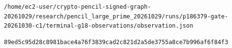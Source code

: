 \documentclass[10pt]{article}
\begin{document}
\texttt{\small /\allowbreak{}h\allowbreak{}o\allowbreak{}m\allowbreak{}e\allowbreak{}/\allowbreak{}e\allowbreak{}c\allowbreak{}2\allowbreak{}-\allowbreak{}u\allowbreak{}s\allowbreak{}e\allowbreak{}r\allowbreak{}/\allowbreak{}c\allowbreak{}r\allowbreak{}y\allowbreak{}p\allowbreak{}t\allowbreak{}o\allowbreak{}-\allowbreak{}p\allowbreak{}e\allowbreak{}n\allowbreak{}c\allowbreak{}i\allowbreak{}l\allowbreak{}-\allowbreak{}s\allowbreak{}i\allowbreak{}g\allowbreak{}n\allowbreak{}e\allowbreak{}d\allowbreak{}-\allowbreak{}g\allowbreak{}r\allowbreak{}a\allowbreak{}p\allowbreak{}h\allowbreak{}-\allowbreak{}2\allowbreak{}0\allowbreak{}2\allowbreak{}6\allowbreak{}1\allowbreak{}0\allowbreak{}2\allowbreak{}9\allowbreak{}/\allowbreak{}r\allowbreak{}e\allowbreak{}s\allowbreak{}e\allowbreak{}a\allowbreak{}r\allowbreak{}c\allowbreak{}h\allowbreak{}/\allowbreak{}p\allowbreak{}e\allowbreak{}n\allowbreak{}c\allowbreak{}i\allowbreak{}l\allowbreak{}\_\allowbreak{}l\allowbreak{}a\allowbreak{}r\allowbreak{}g\allowbreak{}e\allowbreak{}\_\allowbreak{}p\allowbreak{}r\allowbreak{}i\allowbreak{}m\allowbreak{}e\allowbreak{}\_\allowbreak{}2\allowbreak{}0\allowbreak{}2\allowbreak{}6\allowbreak{}1\allowbreak{}0\allowbreak{}2\allowbreak{}9\allowbreak{}/\allowbreak{}r\allowbreak{}u\allowbreak{}n\allowbreak{}s\allowbreak{}/\allowbreak{}p\allowbreak{}1\allowbreak{}8\allowbreak{}6\allowbreak{}3\allowbreak{}7\allowbreak{}9\allowbreak{}-\allowbreak{}g\allowbreak{}a\allowbreak{}t\allowbreak{}e\allowbreak{}-\allowbreak{}2\allowbreak{}0\allowbreak{}2\allowbreak{}6\allowbreak{}1\allowbreak{}0\allowbreak{}3\allowbreak{}0\allowbreak{}-\allowbreak{}c\allowbreak{}1\allowbreak{}/\allowbreak{}t\allowbreak{}e\allowbreak{}r\allowbreak{}m\allowbreak{}i\allowbreak{}n\allowbreak{}a\allowbreak{}l\allowbreak{}-\allowbreak{}g\allowbreak{}1\allowbreak{}8\allowbreak{}-\allowbreak{}o\allowbreak{}b\allowbreak{}s\allowbreak{}e\allowbreak{}r\allowbreak{}v\allowbreak{}a\allowbreak{}t\allowbreak{}i\allowbreak{}o\allowbreak{}n\allowbreak{}s\allowbreak{}/\allowbreak{}o\allowbreak{}b\allowbreak{}s\allowbreak{}e\allowbreak{}r\allowbreak{}v\allowbreak{}a\allowbreak{}t\allowbreak{}i\allowbreak{}o\allowbreak{}n\allowbreak{}.\allowbreak{}j\allowbreak{}s\allowbreak{}o\allowbreak{}n\allowbreak{}}\par\texttt{\small 8\allowbreak{}9\allowbreak{}e\allowbreak{}d\allowbreak{}5\allowbreak{}c\allowbreak{}9\allowbreak{}5\allowbreak{}d\allowbreak{}2\allowbreak{}8\allowbreak{}c\allowbreak{}8\allowbreak{}9\allowbreak{}8\allowbreak{}1\allowbreak{}b\allowbreak{}a\allowbreak{}c\allowbreak{}e\allowbreak{}4\allowbreak{}a\allowbreak{}7\allowbreak{}6\allowbreak{}f\allowbreak{}3\allowbreak{}8\allowbreak{}3\allowbreak{}9\allowbreak{}c\allowbreak{}a\allowbreak{}d\allowbreak{}2\allowbreak{}c\allowbreak{}8\allowbreak{}2\allowbreak{}1\allowbreak{}d\allowbreak{}2\allowbreak{}a\allowbreak{}5\allowbreak{}d\allowbreak{}e\allowbreak{}3\allowbreak{}7\allowbreak{}5\allowbreak{}5\allowbreak{}a\allowbreak{}8\allowbreak{}c\allowbreak{}e\allowbreak{}7\allowbreak{}b\allowbreak{}9\allowbreak{}9\allowbreak{}6\allowbreak{}a\allowbreak{}f\allowbreak{}6\allowbreak{}f\allowbreak{}8\allowbreak{}4\allowbreak{}f\allowbreak{}3\allowbreak{}}\par
\end{document}
